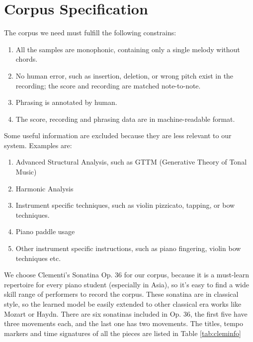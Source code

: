 \section{Corpus Specification}

The corpus we need must fulfill the following constrains:
\begin{enumerate}
   \item All the samples are monophonic, containing only a single melody without chords.
   \item No human error, such as insertion, deletion, or wrong pitch exist in the recording; the score and recording are matched note-to-note.
   \item Phrasing is annotated by human. 
   \item The score, recording and phrasing data are in machine-readable format.

\end{enumerate}

Some useful information are excluded because they are less relevant to our system. Examples are:

\begin{enumerate}
   \item Advanced Structural Analysis, such as GTTM (Generative Theory of Tonal Music)\cite{GTTM}
   \item Harmonic Analysis
   \item Instrument specific techniques, such as violin pizzicato, tapping, or bow techniques.
   \item Piano paddle usage
   \item Other instrument specific instructions, such as piano fingering, violin bow techniques etc.
\end{enumerate}

We choose Clementi's Sonatina Op. 36 for our corpus, because it is a must-learn repertoire for every piano student (especially in Asia), so it's easy to find a wide skill range of performers to record the corpus. These sonatina are in classical style, so the learned model be easily extended to other classical era works like Mozart or Haydn. There are six sonatinas included in Op. 36, the first five have three movements each, and the last one has two movements. The titles, tempo markers and time signatures of all the pieces are listed in Table \ref{tab:cleminfo}

